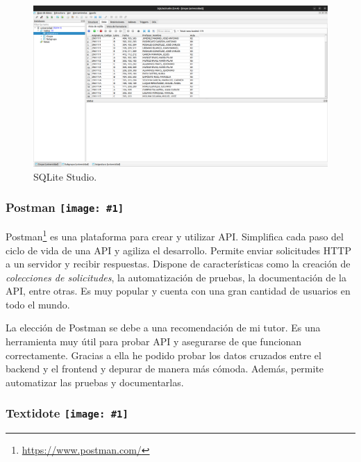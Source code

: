 \begin{figure}[H]
    \centering
    \includegraphics[width=1\textwidth]{./imagenes/SQLiteStudio.png}
    \caption{SQLite Studio.}
\end{figure}

\renewcommand{\icon}[1]{\texttt{[image: \#1]}}
\subsubsection*{Postman \protect\icon{./imagenes/postman_logo.png}}



Postman\footnote{\url{https://www.postman.com/}} es una plataforma para crear y utilizar API. Simplifica cada paso del ciclo de vida de una API y agiliza el desarrollo. Permite enviar solicitudes HTTP a un servidor y recibir respuestas. Dispone de características como la creación de \textit{colecciones de solicitudes}, la automatización de pruebas, la documentación de la API, entre otras. Es muy popular y cuenta con una gran cantidad de usuarios en todo el mundo.\newline

La elección de Postman se debe a una recomendación de mi tutor. Es una herramienta muy útil para probar API y asegurarse de que funcionan correctamente. Gracias a ella he podido probar los datos cruzados entre el backend y el frontend y depurar de manera más cómoda. Además, permite automatizar las pruebas y documentarlas.\newline

\renewcommand{\icon}[1]{\texttt{[image: \#1]}}
\subsubsection*{Textidote \protect\icon{./imagenes/textidote_logo.png}}



